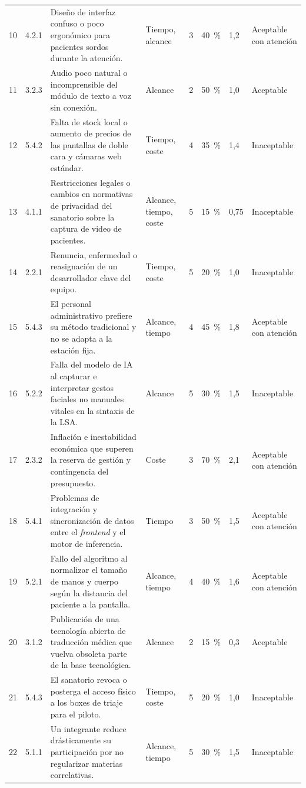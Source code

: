 {\begin{longtable}{@{}p{0.6cm}p{0.95cm}p{5.4cm}p{2.0cm}p{0.9cm}p{1.0cm}p{0.9cm}p{2.1cm}@{}}
10 & 4.2.1 & Diseño de interfaz confuso o poco ergonómico para pacientes sordos durante la atención. & Tiempo, alcance & 3 & 40~\% & 1,2 & Aceptable con atención \\
11 & 3.2.3 & Audio poco natural o incomprensible del módulo de texto a voz sin conexión. & Alcance & 2 & 50~\% & 1,0 & Aceptable \\
12 & 5.4.2 & Falta de stock local o aumento de precios de las pantallas de doble cara y cámaras web estándar. & Tiempo, coste & 4 & 35~\% & 1,4 & Inaceptable \\
13 & 4.1.1 & Restricciones legales o cambios en normativas de privacidad del sanatorio sobre la captura de video de pacientes. & Alcance, tiempo, coste & 5 & 15~\% & 0,75 & Inaceptable \\
14 & 2.2.1 & Renuncia, enfermedad o reasignación de un desarrollador clave del equipo. & Tiempo, coste & 5 & 20~\% & 1,0 & Inaceptable \\
15 & 5.4.3 & El personal administrativo prefiere su método tradicional y no se adapta a la estación fija. & Alcance, tiempo & 4 & 45~\% & 1,8 & Aceptable con atención \\
16 & 5.2.2 & Falla del modelo de IA al capturar e interpretar gestos faciales no manuales vitales en la sintaxis de la LSA. & Alcance & 5 & 30~\% & 1,5 & Inaceptable \\
17 & 2.3.2 & Inflación e inestabilidad económica que superen la reserva de gestión y contingencia del presupuesto. & Coste & 3 & 70~\% & 2,1 & Aceptable con atención \\
18 & 5.4.1 & Problemas de integración y sincronización de datos entre el \emph{frontend} y el motor de inferencia. & Tiempo & 3 & 50~\% & 1,5 & Aceptable con atención \\
19 & 5.2.1 & Fallo del algoritmo al normalizar el tamaño de manos y cuerpo según la distancia del paciente a la pantalla. & Alcance, tiempo & 4 & 40~\% & 1,6 & Aceptable con atención \\
20 & 3.1.2 & Publicación de una tecnología abierta de traducción médica que vuelva obsoleta parte de la base tecnológica. & Alcance & 2 & 15~\% & 0,3 & Aceptable \\
21 & 5.4.3 & El sanatorio revoca o posterga el acceso físico a los boxes de triaje para el piloto. & Tiempo, coste & 5 & 20~\% & 1,0 & Inaceptable \\
22 & 5.1.1 & Un integrante reduce drásticamente su participación por no regularizar materias correlativas. & Alcance, tiempo & 5 & 30~\% & 1,5 & Inaceptable \\

\end{longtable}}
